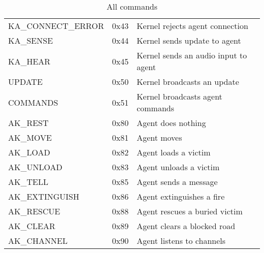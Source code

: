\begin{table}[pht]
\begin{tabular}{|l|l|l|}
KA\_CONNECT\_ERROR & 0x43 & Kernel rejects agent connection\\
KA\_SENSE & 0x44 & Kernel sends update to agent\\
KA\_HEAR & 0x45 & Kernel sends an audio input to agent\\
\hline
UPDATE & 0x50 & Kernel broadcasts an update\\
COMMANDS & 0x51 & Kernel broadcasts agent commands\\
\hline
AK\_REST & 0x80 & Agent does nothing\\
AK\_MOVE & 0x81 & Agent moves\\
AK\_LOAD & 0x82 & Agent loads a victim\\
AK\_UNLOAD & 0x83 & Agent unloads a victim\\
AK\_TELL & 0x85 & Agent sends a message\\
AK\_EXTINGUISH & 0x86 & Agent extinguishes a fire\\
AK\_RESCUE & 0x88 & Agent rescues a buried victim\\
AK\_CLEAR & 0x89 & Agent clears a blocked road\\
AK\_CHANNEL & 0x90 & Agent listens to channels\\
\hline
\end{tabular}
\caption{All commands}
\label{table_commands}
\end{table}


